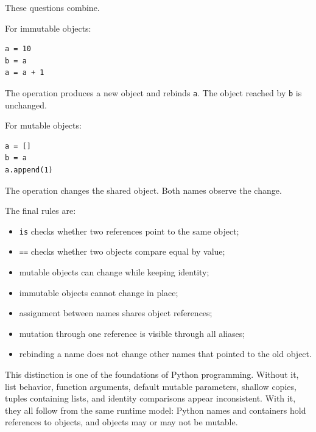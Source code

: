 These questions combine.

For immutable objects:

\begin{verbatim}
a = 10
b = a
a = a + 1
\end{verbatim}

The operation produces a new object and rebinds \texttt{a}. The object reached by \texttt{b} is unchanged.

For mutable objects:

\begin{verbatim}
a = []
b = a
a.append(1)
\end{verbatim}

The operation changes the shared object. Both names observe the change.

The final rules are:

\begin{itemize}
    \item \texttt{is} checks whether two references point to the same object;
    \item \texttt{==} checks whether two objects compare equal by value;
    \item mutable objects can change while keeping identity;
    \item immutable objects cannot change in place;
    \item assignment between names shares object references;
    \item mutation through one reference is visible through all aliases;
    \item rebinding a name does not change other names that pointed to the old object.
\end{itemize}

This distinction is one of the foundations of Python programming. Without it, list behavior, function arguments, default mutable parameters, shallow copies, tuples containing lists, and identity comparisons appear inconsistent. With it, they all follow from the same runtime model: Python names and containers hold references to objects, and objects may or may not be mutable.